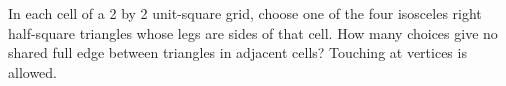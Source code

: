 In each cell of a 2 by 2 unit-square grid, choose one of the four isosceles right half-square triangles whose legs are sides of that cell. How many choices give no shared full edge between triangles in adjacent cells? Touching at vertices is allowed.
